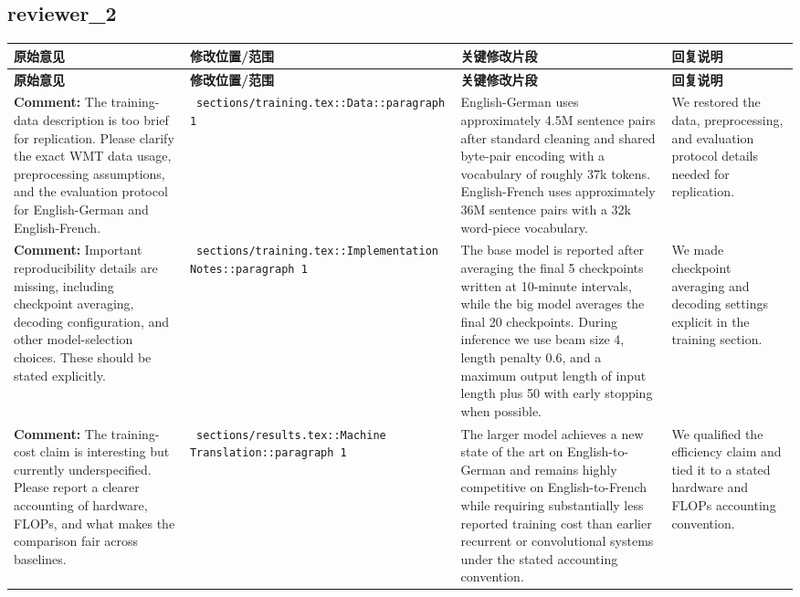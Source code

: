 \documentclass[11pt]{article}
\begin{document}
\subsection*{ reviewer\_2 }
\begin{longtable}{|p{}|p{}|p{}|p{}|}
\hline
\textbf{原始意见} & \textbf{修改位置/范围} & \textbf{关键修改片段} & \textbf{回复说明} \\
\hline
\endfirsthead
\hline
\textbf{原始意见} & \textbf{修改位置/范围} & \textbf{关键修改片段} & \textbf{回复说明} \\
\hline
\endhead
\textbf{Comment:} The training-data description is too brief for replication. Please clarify the exact WMT data usage, preprocessing assumptions, and the evaluation protocol for English-German and English-French. & \texttt{ sections/training.tex::Data::paragraph 1 } & {\color{blue}\ttfamily English-German uses approximately 4.5M sentence pairs after standard cleaning and shared byte-pair encoding with a vocabulary of roughly 37k tokens. English-French uses approximately 36M sentence pairs with a 32k word-piece vocabulary.} & We restored the data, preprocessing, and evaluation protocol details needed for replication. \\
\hline
\textbf{Comment:} Important reproducibility details are missing, including checkpoint averaging, decoding configuration, and other model-selection choices. These should be stated explicitly. & \texttt{ sections/training.tex::Implementation Notes::paragraph 1 } & {\color{blue}\ttfamily The base model is reported after averaging the final 5 checkpoints written at 10-minute intervals, while the big model averages the final 20 checkpoints. During inference we use beam size 4, length penalty 0.6, and a maximum output length of input length plus 50 with early stopping when possible.} & We made checkpoint averaging and decoding settings explicit in the training section. \\
\hline
\textbf{Comment:} The training-cost claim is interesting but currently underspecified. Please report a clearer accounting of hardware, FLOPs, and what makes the comparison fair across baselines. & \texttt{ sections/results.tex::Machine Translation::paragraph 1 } & {\color{blue}\ttfamily The larger model achieves a new state of the art on English-to-German and remains highly competitive on English-to-French while requiring substantially less reported training cost than earlier recurrent or convolutional systems under the stated accounting convention.} & We qualified the efficiency claim and tied it to a stated hardware and FLOPs accounting convention. \\

\end{longtable}
\end{document}
